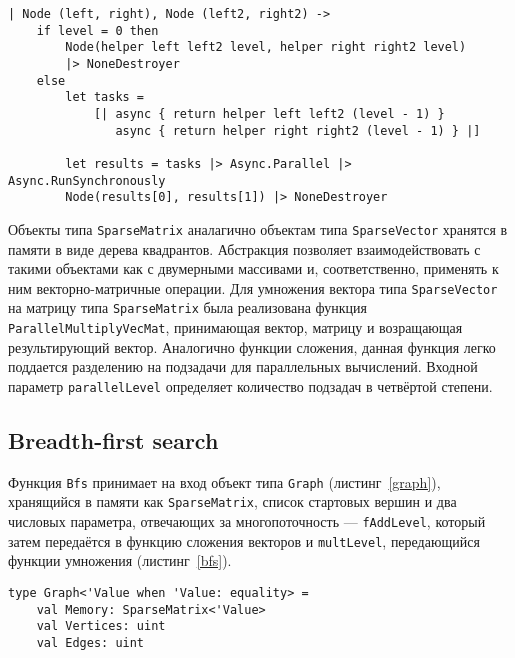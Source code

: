 \begin{lstlisting}[style=codelistingstyle, caption={Разделение задачи сложения двух деревьев на две подзадачи и использование потоков для получения результата},label={addparallel}, frame=single]
| Node (left, right), Node (left2, right2) ->
    if level = 0 then
        Node(helper left left2 level, helper right right2 level)
        |> NoneDestroyer
    else
        let tasks =
            [| async { return helper left left2 (level - 1) }
               async { return helper right right2 (level - 1) } |]

        let results = tasks |> Async.Parallel |> Async.RunSynchronously
        Node(results[0], results[1]) |> NoneDestroyer
\end{lstlisting}

Объекты типа \texttt{SparseMatrix} аналагично объектам типа \texttt{SparseVector} хранятся в памяти в виде дерева квадрантов. Абстракция позволяет взаимодействовать с такими объектами как с двумерными массивами и, соответственно, применять к ним векторно-матричные операции. Для умножения вектора типа \texttt{SparseVector} на матрицу типа \texttt{SparseMatrix} была реализована функция \texttt{ParallelMultiplyVecMat}, принимающая вектор, матрицу и возращающая результирующий вектор. Аналогично функции сложения, данная функция легко поддается разделению на подзадачи для параллельных вычислений. Входной параметр \texttt{parallelLevel} определяет количество подзадач в четвёртой степени.

\subsection{Breadth-first search}
Функция \texttt{Bfs} принимает на вход объект типа \texttt{Graph} (листинг~\ref{graph}), хранящийся в памяти как \texttt{SparseMatrix}, список стартовых вершин и два числовых параметра, отвечающих за многопоточность --- \texttt{fAddLevel}, который затем передаётся в функцию сложения векторов и \texttt{multLevel}, передающийся функции умножения (листинг~\ref{bfs}).

\newpage
\begin{lstlisting}[style=codelistingstyle,caption={Тип Graph},label={graph}, frame=single]
type Graph<'Value when 'Value: equality> =
    val Memory: SparseMatrix<'Value>
    val Vertices: uint
    val Edges: uint
\end{lstlisting}

